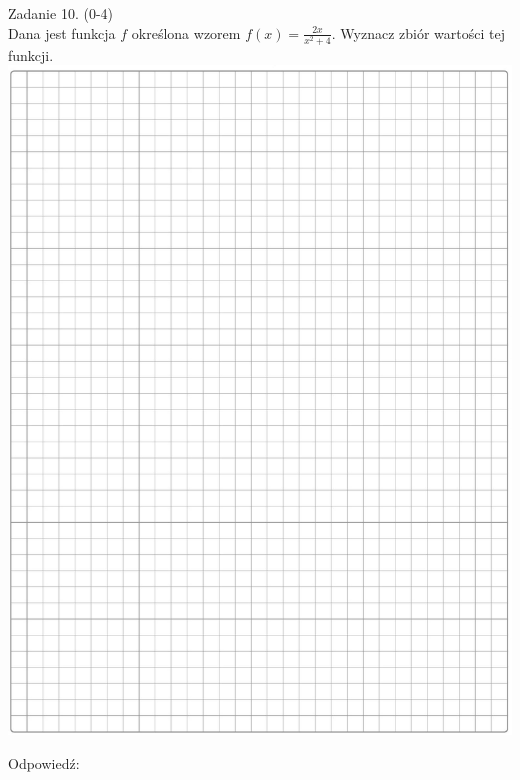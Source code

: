 \documentclass[10pt]{article}
\begin{document}
Zadanie 10. (0-4)\\
Dana jest funkcja \(f\) określona wzorem \(f(x)=\frac{2 x}{x^{2}+4}\). Wyznacz zbiór wartości tej funkcji.\\
\includegraphics[max width=\textwidth, center]{2024_11_21_06df787f12c5337a1fe8g-07}

Odpowiedź:
\end{document}
